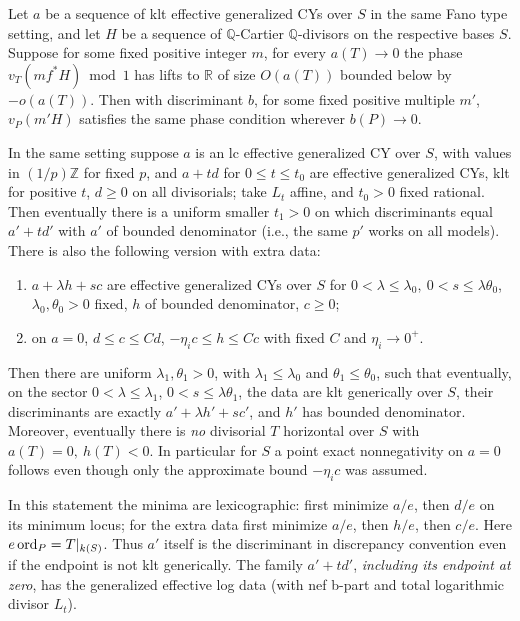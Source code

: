 \begin{lemma}\label{lem:A-pullback-phases} Let \(a\) be a sequence of klt effective generalized CYs over \(S\) in the same Fano type setting, and let \(H\) be a sequence of \(\mathbb Q\)-Cartier \(\mathbb Q\)-divisors on the respective bases \(S\).
Suppose for some fixed positive integer \(m\), for every \(a(T)\to0\) the phase \(v_T(m f^*H)\bmod 1\) has lifts to \(\mathbb R\) of size \(O(a(T))\) bounded below by \(-o(a(T))\).
Then with discriminant \(b\), for some fixed positive multiple \(m'\), \(v_P(m'H)\) satisfies the same phase condition wherever \(b(P)\to0\).

\end{lemma}

\begin{lemma}\label{lem:A-linear-chamber} In the same setting suppose \(a\) is an lc effective generalized CY over \(S\), with values in \((1/p)\mathbb Z\) for fixed \(p\), and \(a+t d\) for \(0\le t\le t_0\) are effective generalized CYs, klt for positive \(t\), \(d\ge0\) on all divisorials; take \(L_t\) affine, and \(t_0>0\) fixed rational.
Then eventually there is a uniform smaller \(t_1>0\) on which discriminants equal \(a'+t d'\) with \(a'\) of bounded denominator (i.e., the same \(p'\) works on all models).
There is also the following version with extra data:
\begin{enumerate}[label=\textup{(\roman*)}]
\item \(a+\lambda h+s c\) are effective generalized CYs over \(S\) for \(0<\lambda\le\lambda_0,\ 0<s\le\lambda\theta_0\), \(\lambda_0,\theta_0>0\) fixed, \(h\) of bounded denominator, \(c\ge0\);
\item on \(a=0\), \(d\le c\le C d\), \(-\eta_i c\le h\le Cc\) with fixed \(C\) and \(\eta_i\to0^+\).
\end{enumerate}

Then there are uniform \(\lambda_1,\theta_1>0\), with
\(\lambda_1\le\lambda_0\) and \(\theta_1\le\theta_0\), such that
eventually, on the sector
\(0<\lambda\le\lambda_1\), \(0<s\le\lambda\theta_1\), the data
are klt generically over \(S\), their discriminants are exactly
\(a'+\lambda h'+s c'\), and \(h'\) has bounded denominator.
Moreover, eventually there is \emph{no} divisorial \(T\) horizontal
over \(S\) with \(a(T)=0,\ h(T)<0\).
In particular for \(S\) a point exact nonnegativity on \(a=0\) follows even though only the approximate bound \(-\eta_i c\) was assumed.

In this statement the minima are lexicographic: first minimize \(a/e\),
then \(d/e\) on its minimum locus; for the extra data first minimize
\(a/e\), then \(h/e\), then \(c/e\).
Here \(e\operatorname{ord}_P=T|_{k(S)}\).
Thus \(a'\) itself is the discriminant in discrepancy convention even
if the endpoint is not klt generically.
The family \(a'+t d'\), \emph{including its endpoint at zero}, has the generalized effective log data (with nef b-part and total logarithmic divisor \(L_t\)).

\end{lemma}

